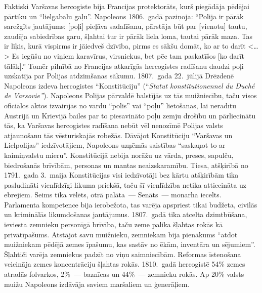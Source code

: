 \documentclass[twoside,a5paper,12pt,fleqn,openany]{extbook}
\newcommand{\frtxti}[1]{\textit{\textfrench{#1}}}
\newcommand{\citespace}{<\dots{}>}
\begin{document}
Faktiski Varšavas hercogiste bija Francijas protektorāts, kurš piegādāja pēdējai pārtiku un ``lielgabalu gaļu''. Napoleons 1806.~gadā paziņoja: ``Polija ir pārāk sarežģīts jautājums: [poļi] pieļāva sadalīšanu, pārstāja būt par [vienotu] tautu, zaudēja sabiedrības garu, šļahtai tur ir pārāk liela loma, tautai pārāk maza. Tas ir līķis, kurā vispirms ir jāiedveš dzīvība, pirms es sākšu domāt, ko ar to darīt \citespace{} Es iegūšu no viņiem karavīrus, virsniekus, bet pēc tam paskatīšos [ko darīt tālāk].'' Tomēr pilnībā no Francijas atkarīgās hercogistes radīšanu daudzi poļi uzskatīja par Polijas atdzimšanas sākumu. 1807.~gada 22.~jūlijā Drēzdenē Napoleons izdeva hercogistes ``Konstitūciju'' (``\frtxti{Statut konstitutionennel du Duché de Varsovie''}). Napoleons Polijas pārvaldē balstījās uz tās muižniecību, taču visos oficiālos aktos izvairījās no vārdu ``polis'' vai ``poļu'' lietošanas, lai neradītu Austrijā un Krievijā bailes par to piesavināto poļu zemju drošību un pārliecinātu tās, ka Varšavas hercogistes radīšana nebūt vēl nenozīmē Polijas valsts atjaunošanu tās vēsturiskajās robežās. Dāvājot Konstitūciju ``Varšavas un Lielpolijas'' iedzīvotājiem, Napoleons uzņēmās saistības ``saskaņot to ar kaimiņvalstu mieru''. Konstitūcijā nebija norāžu uz vārda, preses, sapulču, biedrošanās brīvībām, personas un mantas neaizskaramību. Tiesa, atšķirībā no 1791.~gada 3.~maija Konstitūcijas visi iedzīvotāji bez kārtu atšķirībām tika pasludināti vienlīdzīgi likuma priekšā, taču šī vienlīdzība netika attiecināta uz ebrejiem. Seims tika vēlēts, otrā palāta~--- Senāts~--- monarha iecelts. Parlamenta kompetence bija ierobežota, tas varēja apspriest tikai budžeta, civilās un kriminālās likumdošanas jautājumus. 1807.~gadā tika atcelta dzimtbūšana, ieviesta zemnieku personīgā brīvība, taču zeme palika šļahtas rokās kā privātīpašums. Atstājot savu muižnieku, zemniekam bija pienākums ``atdot muižniekam pēdējā zemes īpašumu, kas sastāv no ēkām, inventāra un sējumiem''. Šļahtiči varēja zemniekus padzīt no viņu saimniecībām. Reformas īstenošana veicināja zemes koncentrāciju šļahtas rokās. 1810.~gadā hercogistē 54\% zemes atradās folvarkos, 2\%~--- baznīcas un 44\%~--- zemnieku rokās. Ap 20\% valsts muižu Napoleons izdāvāja saviem maršaliem un ģenerāļiem.
\end{document}
